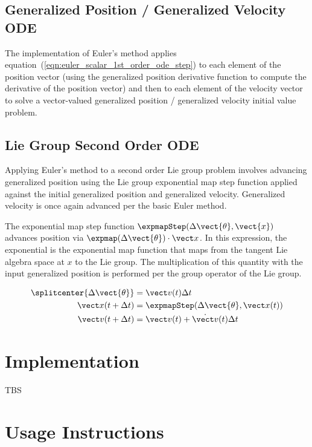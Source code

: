 \subsection{Generalized Position / Generalized Velocity ODE}

The \erseven implementation of Euler's method applies
equation~(\ref{eqn:euler_scalar_1st_order_ode_step})
to each element of the position vector (using the generalized position
derivative function to compute the derivative of the position vector)
and then to each element of the velocity vector to solve a
vector-valued generalized position / generalized velocity initial value problem.


\subsection{Lie Group Second Order ODE}

Applying Euler's method to a second order Lie group problem involves
advancing generalized position using the Lie group exponential map step function
applied against the initial generalized position and generalized velocity.
Generalized velocity is once again advanced per the basic Euler method.

The exponential map step function
$\expmapStep(\Delta \vect{\theta}, \vect{x})$ advances
position via $\expmap(\Delta \vect{\theta})\cdot \vect x$. In this expression,
the exponential is the exponential map function that maps from the tangent
Lie algebra space at $x$ to the Lie group. The multiplication of this
quantity with the input generalized position is performed per the group operator
of the Lie group.

\begin{equation}
\label{eqn:euler_lie_group_position}
\begin{split}
\splitcenter{\Delta \vect{\theta}} &= \vect v(t) \Delta t \\
\vect x(t+\Delta t) &= \expmapStep(\Delta \vect{\theta}, \vect x(t)) \\
\vect v(t+\Delta t) &= \vect v(t) + \dot{\vect v}(t) \Delta t
\end{split}
\end{equation}

\section{Implementation}

TBS

\section{Usage Instructions}


